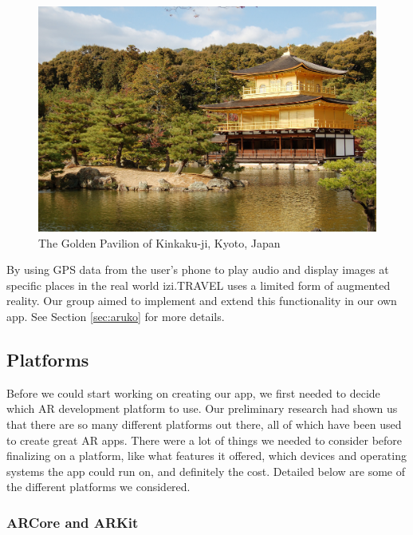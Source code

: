\documentclass[a4paper, 10pt, american, titlepage]{article}
\begin{document}
\begin{figure}[h]
	\centering
	\includegraphics[width=\textwidth]{kinkakuji.jpg}
	\caption[The Golden Pavilion of Kinkaku-ji, Kyoto, Japan]{The Golden
		Pavilion of Kinkaku-ji, Kyoto, Japan~\autocite{davidson2005}}
	\label{fig:kinkakuji}
\end{figure}

By using GPS data from the user's phone to play audio and display images at
specific places in the real world izi.TRAVEL uses a limited form of augmented
reality. Our group aimed to implement and extend this functionality in our own
app. See Section \ref{sec:aruko} for more details.

\subsection{Platforms}
\label{sec:platforms}

Before we could start working on creating our app, we first needed to decide
which AR development platform to use. Our preliminary research had shown us that
there are so many different platforms out there, all of which have been used to
create great AR apps. There were a lot of things we needed to consider before
finalizing on a platform, like what features it offered, which devices and
operating systems the app could run on, and definitely the cost. Detailed below
are some of the different platforms we considered.

\subsubsection{ARCore and ARKit}
\label{sec:ARCoreAndARKit}
\end{document}
